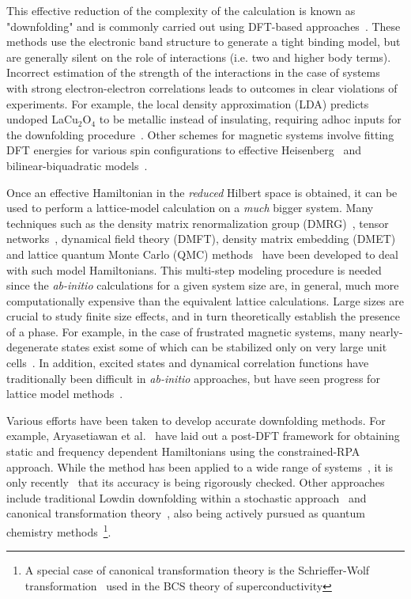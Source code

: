 \documentclass[aip,jcp,twocolumn,10pt]{revtex4-1}
\begin{document}
This effective reduction of the complexity of the calculation is known as "downfolding" 
and is commonly carried out using DFT-based approaches~\cite{Pavirini,Dasgupta}. 
These methods use the electronic band structure to generate a tight binding model, 
but are generally silent on the role of interactions (i.e. two and higher body terms). 
Incorrect estimation of the strength of the interactions 
in the case of systems with strong electron-electron correlations leads to 
outcomes in clear violations of experiments. For example, the local density 
approximation (LDA) predicts undoped LaCu$_2$O$_4$ 
to be metallic instead of insulating, requiring adhoc inputs for 
the downfolding procedure~\cite{Kent_Hubbard}. 
Other schemes for magnetic systems involve fitting DFT energies for 
various spin configurations to effective Heisenberg~\cite{Valenti_kagome} 
and bilinear-biquadratic models~\cite{Spaldin}.    

Once an effective Hamiltonian in the \emph{reduced} Hilbert space 
is obtained, it can be used to perform a lattice-model calculation 
on a \emph{much} bigger system. Many techniques such as the density matrix 
renormalization group (DMRG)~\cite{dmrg_white}, tensor networks~\cite{tps_nishino,Vidal_MERA,
TPS_review,Changlani_CPS,Neuscamman_CPS,mezzacapo,Marti}, 
dynamical field theory (DMFT), density matrix embedding (DMET)~\cite{DMET_2012,Chen_DMET} 
and lattice quantum Monte Carlo (QMC) methods~\cite{Sandvik_loops,Blankenbecler,Alavi_FCIQMC,SQMC} 
have been developed to deal with such model Hamiltonians. 
This multi-step modeling procedure is needed since the \emph{ab-initio} 
calculations for a given system size are, in general, much more 
computationally expensive than the equivalent lattice calculations. 
Large sizes are crucial to study finite size effects, and in turn 
theoretically establish the presence of a phase. For example, in the case of 
frustrated magnetic systems, many nearly-degenerate states exist some of which can be 
stabilized only on very large unit cells~\cite{Marston_Zeng}. 
In addition, excited states and dynamical correlation functions have traditionally 
been difficult in \emph{ab-initio} approaches, 
but have seen progress for lattice model methods~\cite{Daley_tDMRG, White_tDMRG}.

Various efforts have been taken to develop accurate downfolding 
methods. For example, Aryasetiawan et al.~\cite{Aryasetiawan} 
have laid out a post-DFT framework for obtaining 
static and frequency dependent Hamiltonians using the 
constrained-RPA approach. While the method has been applied to 
a wide range of systems~\cite{Imada1,Imada2,Arya1,Arya2,Wehling_graphene}, 
it is only recently~\cite{RPA_Troyer} that its accuracy is being rigorously checked. 
Other approaches include traditional Lowdin downfolding 
within a stochastic approach~\cite{Tenno} and 
canonical transformation theory~\cite{White_CT,Yanai_CT}, 
also being actively pursued as quantum chemistry 
methods~\footnote{A special case of canonical transformation theory is 
the Schrieffer-Wolf transformation~\cite{Schrieffer_Wolff} used in the 
BCS theory of superconductivity}.  
\end{document}
